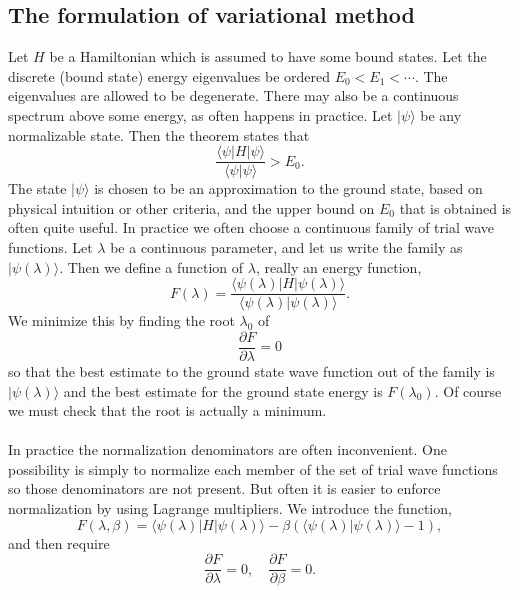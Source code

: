 \subsection{The formulation of variational method}
Let $H$ be a Hamiltonian which is assumed to have some bound states. Let the discrete (bound state) energy eigenvalues be ordered $E_0 < E_1 < \cdots$. The eigenvalues are allowed to be degenerate. There may also be a continuous spectrum above some energy, as often happens in practice.
Let $|\psi\rangle$ be any normalizable state. Then the theorem states that
\[\frac{\langle \psi | H | \psi \rangle}{\langle \psi | \psi \rangle} > E_0.\]
The state $|\psi\rangle$ is chosen to be an approximation to the ground state, based on physical intuition or other criteria, and the upper bound on $E_0$ that is obtained is often quite useful.
In practice we often choose a continuous family of trial wave functions. Let $\lambda$ be a continuous parameter, and let us write the family as $|\psi(\lambda)\rangle$. Then we define a function of $\lambda$, really an energy function,
\[F(\lambda) = \frac{\langle \psi(\lambda) | H | \psi(\lambda) \rangle}{\langle \psi(\lambda) | \psi(\lambda) \rangle}.\]
We minimize this by finding the root $\lambda_0$ of
\[\frac{\partial F}{\partial \lambda} = 0\]
so that the best estimate to the ground state wave function out of the family is $|\psi(\lambda)\rangle$ and the best estimate for the ground state energy is $F(\lambda_0)$. 
Of course we must check that the root is actually a minimum.
\\ \\
In practice the normalization denominators are often inconvenient. One possibility is simply to normalize each member of the set of trial wave functions so those denominators are not
present. 
But often it is easier to enforce normalization by using Lagrange multipliers. We introduce the function,
\[F(\lambda,\beta) = \langle \psi(\lambda) | H | \psi(\lambda) \rangle - \beta (\langle \psi(\lambda) | \psi(\lambda) \rangle - 1),\]
and then require
\[\frac{\partial F}{\partial \lambda} = 0 , \quad \frac{\partial F}{\partial \beta} = 0.\]

